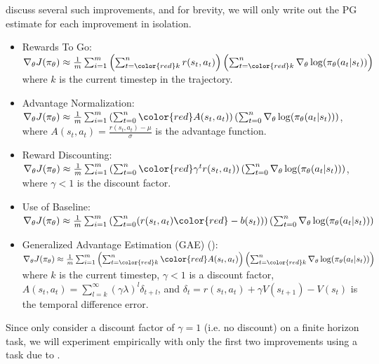 \documentclass{article} %
\begin{document}
\cite{Levine-et-al-2023} discuss several such improvements, and for brevity,
we will only write out the PG estimate for each improvement in isolation.
\begin{itemize} \label{lst:pg_improvements}
    \item Rewards To Go: $\nabla_\theta J(\pi_\theta) \approx \frac{1}{m} \sum_{i=1}^{m} \left(\sum_{t={\color{red} k}}^{n} r(s_t, a_t)\right) \left( \sum_{t={\color{red} k}}^{n} \nabla_\theta \log(\pi_\theta(a_t | s_t)) \right)$ 
        \newline where $k$ is the current timestep in the trajectory.
    \item Advantage Normalization: $\nabla_\theta J(\pi_\theta) \approx \frac{1}{m} \sum_{i=1}^{m} \left(\sum_{t=0}^{n} {\color{red} A(s_t, a_t)} \right) \left( \sum_{t=0}^{n} \nabla_\theta \log(\pi_\theta(a_t | s_t)) \right)$, 
        \newline where $A(s_t, a_t) = \frac{r(s_t, a_t) - \mu}{\sigma}$ is the advantage function.
    \item Reward Discounting: $\nabla_\theta J(\pi_\theta) \approx \frac{1}{m} \sum_{i=1}^{m} \left(\sum_{t=0}^{n} {\color{red} \gamma^t} r(s_t, a_t)\right) \left( \sum_{t=0}^{n} \nabla_\theta \log(\pi_\theta(a_t | s_t)) \right)$, 
        \newline where $\gamma < 1$ is the discount factor.
    \item Use of Baseline: $\nabla_\theta J(\pi_\theta) \approx \frac{1}{m} \sum_{i=1}^{m} \left(\sum_{t=0}^{n} (r(s_t, a_t) {\color{red} - b(s_t)})\right) \left( \sum_{t=0}^{n} \nabla_\theta \log(\pi_\theta(a_t | s_t)) \right)$
    \item Generalized Advantage Estimation (GAE) (\cite{Schulman-et-al-2018}): 
        \newline $\nabla_\theta J(\pi_\theta) \approx \frac{1}{m} \sum_{i=1}^{m} \left(\sum_{t={\color{red} k}}^{n} {\color{red} A(s_t, a_t)}\right) \left( \sum_{t={\color{red} k}}^{n} \nabla_\theta \log(\pi_\theta(a_t | s_t)) \right)$
        \newline where $k$ is the current timestep, $\gamma < 1$ is a discount factor, $A(s_t, a_t) = \sum_{l=k}^{\infty} (\gamma \lambda)^l \delta_{t + l}$, and $\delta_t = r(s_t, a_t) + \gamma V(s_{t + 1}) - V(s_t)$ is the temporal difference error.
\end{itemize}

Since \cite{Levine-et-al-2023} only consider a discount factor of $\gamma = 1$ (i.e. no discount) on a finite horizon task,
we will experiment empirically with only the first two improvements using a task due to \cite{Towers-et-al-2024}.
\end{document}
